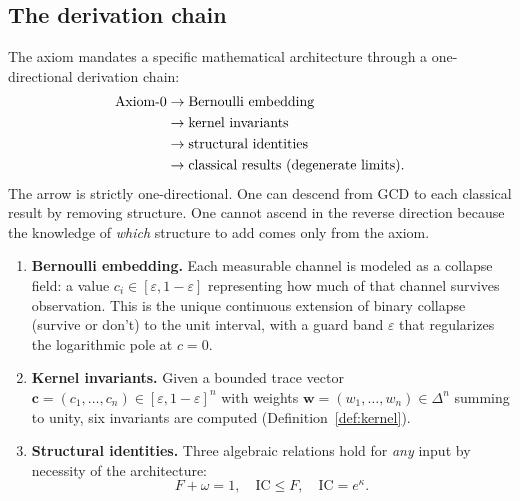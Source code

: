 \documentclass[
  aps,
  prd,
  twocolumn,
  superscriptaddress,
  nofootinbib,
  floatfix
]{revtex4-2}
\newcommand{\eps}{\varepsilon}
\newcommand{\beq}{\begin{equation}}
\newcommand{\eeq}{\end{equation}}
\newcommand{\tvec}{\mathbf{c}}
\newcommand{\wvec}{\mathbf{w}}
\newcommand{\IC}{\mathrm{IC}}
\begin{document}
\subsection{The derivation chain}

The axiom mandates a specific mathematical architecture through a
one-directional derivation chain:
\begin{align}\label{eq:chain}
\text{Axiom-0} &\to \text{Bernoulli embedding} \notag\\
               &\to \text{kernel invariants} \notag\\
               &\to \text{structural identities} \notag\\
               &\to \text{classical results (degenerate limits)}.
\end{align}
The arrow is strictly one-directional.  One can descend from GCD to
each classical result by removing structure.  One cannot ascend in
the reverse direction because the knowledge of \emph{which} structure
to add comes only from the axiom.

\begin{enumerate}[leftmargin=*,label=\textbf{(\arabic*)}]
\item \textbf{Bernoulli embedding.}  Each measurable channel is
  modeled as a collapse field: a value $c_i \in [\eps, 1-\eps]$
  representing how much of that channel survives observation.  This
  is the unique continuous extension of binary collapse
  (survive or don't) to the unit interval, with a guard band $\eps$
  that regularizes the logarithmic pole at $c = 0$.

\item \textbf{Kernel invariants.}  Given a bounded trace vector
  $\tvec = (c_1, \ldots, c_n) \in [\eps, 1{-}\eps]^n$ with weights
  $\wvec = (w_1, \ldots, w_n) \in \Delta^n$ summing to unity, six
  invariants are computed (Definition~\ref{def:kernel}).

\item \textbf{Structural identities.}  Three algebraic relations
  hold for \emph{any} input by necessity of the architecture:
  \beq\label{eq:tier1}
    F + \omega = 1, \quad
    \IC \leq F, \quad
    \IC = e^{\kappa}.
  \eeq
\end{enumerate}
\end{document}
